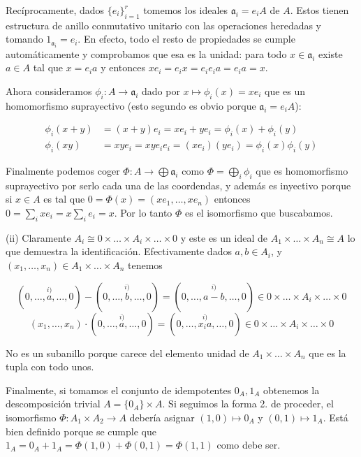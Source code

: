 \documentclass[../main.tex]{subfiles}
\begin{document}
Recíprocamente, dados $\{e_i\}_{i=1}^r$ tomemos los ideales $\mathfrak a_i =e_iA$ de $A$. Estos tienen estructura de anillo conmutativo unitario con las operaciones heredadas y tomando $1_{\mathfrak a_i} = e_i$. En efecto, todo el resto de propiedades se cumple automáticamente y comprobamos que esa es la unidad: para todo $x\in \mathfrak a_i$ existe $a\in A$ tal que $x=e_ia$ y entonces $xe_i = e_ix = e_i e_i a = e_i a = x$.

Ahora consideramos $\phi_i:A\to \mathfrak a_i$ dado por $x\mapsto\phi_i(x) = xe_i$ que es un homomorfismo suprayectivo (esto segundo es obvio porque $\mathfrak a_i = e_iA$):

\begin{align}
    \phi_i(x+y) &= (x+y)e_i = xe_i+ye_i = \phi_i(x)+\phi_i(y)\\
\phi_i(xy) &= xye_i = xye_ie_i = (xe_i)(ye_i) = \phi_i(x)\phi_i(y)
\end{align}

Finalmente podemos coger $\Phi:A\to \bigoplus\mathfrak a_i$ como $\Phi=\bigoplus_i\phi_i$ que es homomorfismo suprayectivo por serlo cada una de las coordendas, y además es inyectivo porque si $x\in A$ es tal que $0 = \Phi(x) = (xe_1,\dots,xe_n)$ entonces $0 = \sum_ixe_i  = x\sum_i e_i = x$. Por lo tanto $\Phi$ es el isomorfismo que buscabamos.

(ii) Claramente $A_i \cong 0\times \ldots\times A_i\times \ldots \times 0$ y este es un ideal de $A_1\times \ldots\times A_n \cong A$ lo que demuestra la identificación. Efectivamente dados $a,b\in A_i$, y $(x_1,\ldots,x_n)\in A_1\times \ldots\times A_n$ tenemos

\begin{equation}
(0,\dots,\overset{i)}{a},\ldots,0)-(0,\dots,\overset{i)}{b},\ldots,0) = (0,\dots,\overset{i)}{a-b},\ldots,0)\in 0\times \ldots\times A_i\times \ldots \times 0
\end{equation}
\begin{equation}
(x_1,\ldots,x_n)\cdot (0,\dots,\overset{i)}{a},\ldots,0) = (0,\dots,\overset{i)}{x_ia},\ldots,0) \in  0\times \ldots\times A_i\times \ldots \times 0
\end{equation}

No es un subanillo porque carece del elemento unidad de $A_1\times \ldots \times A_n$ que es la tupla con todo unos.

Finalmente, si tomamos el conjunto de idempotentes ${0_A,1_A}$ obtenemos la descomposición trivial $A = \{0_A\}\times A$. Si seguimos la forma 2. de proceder, el isomorfismo $\Phi:A_1\times A_2 \to A$ debería asignar $(1,0)\mapsto 0_A$ y $(0,1)\mapsto 1_A$.  Está bien definido porque se cumple que $1_A = 0_A+1_A = \Phi(1,0)+\Phi(0,1) =\Phi(1,1)$ como debe ser.
\end{document}
